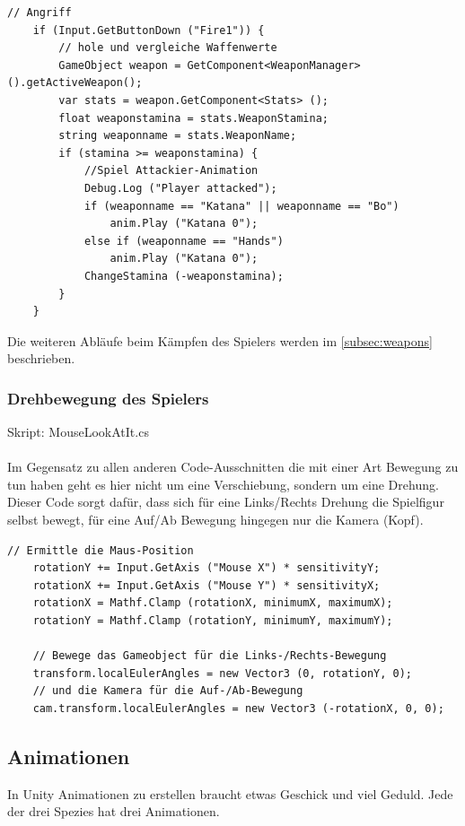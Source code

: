 \begin{lstlisting}[caption={Angriff}]
	// Angriff
	if (Input.GetButtonDown ("Fire1")) {	
		// hole und vergleiche Waffenwerte
		GameObject weapon = GetComponent<WeaponManager> ().getActiveWeapon();
		var stats = weapon.GetComponent<Stats> ();
		float weaponstamina = stats.WeaponStamina;
		string weaponname = stats.WeaponName;
		if (stamina >= weaponstamina) {
			//Spiel Attackier-Animation
			Debug.Log ("Player attacked");
			if (weaponname == "Katana" || weaponname == "Bo")
				anim.Play ("Katana 0");
			else if (weaponname == "Hands")
				anim.Play ("Katana 0"); 
			ChangeStamina (-weaponstamina);
		}
	}
\end{lstlisting}
		
Die weiteren Abläufe beim Kämpfen des Spielers werden im \cref{subsec:weapons} beschrieben.

\subsubsection{Drehbewegung des Spielers}
Skript: MouseLookAtIt.cs\\\\
Im Gegensatz zu allen anderen Code-Ausschnitten die mit einer Art Bewegung zu tun haben geht es hier nicht um eine Verschiebung, sondern um eine Drehung.
Dieser Code sorgt dafür, dass sich für eine Links/Rechts Drehung die Spielfigur selbst bewegt, für eine Auf/Ab Bewegung hingegen nur die Kamera (Kopf).


\begin{lstlisting}[caption={Drehbewegungen}]
	// Ermittle die Maus-Position
	rotationY += Input.GetAxis ("Mouse X") * sensitivityY;
	rotationX += Input.GetAxis ("Mouse Y") * sensitivityX;
	rotationX = Mathf.Clamp (rotationX, minimumX, maximumX);
	rotationY = Mathf.Clamp (rotationY, minimumY, maximumY);
	
	// Bewege das Gameobject für die Links-/Rechts-Bewegung
	transform.localEulerAngles = new Vector3 (0, rotationY, 0);
	// und die Kamera für die Auf-/Ab-Bewegung
	cam.transform.localEulerAngles = new Vector3 (-rotationX, 0, 0);
\end{lstlisting}

\subsection{Animationen}
In Unity Animationen zu erstellen braucht etwas Geschick und viel Geduld. Jede der drei Spezies hat drei Animationen.

